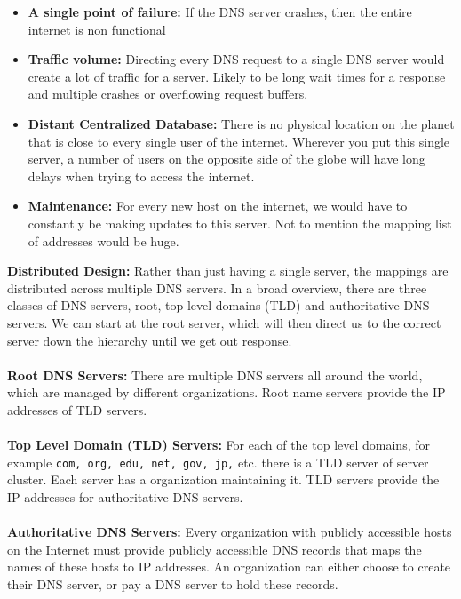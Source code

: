\documentclass[]{article}
\begin{document}
\begin{itemize} 
	\item \textbf{A single point of failure:} If the DNS server crashes, then the entire internet is non functional 
	\item \textbf{Traffic volume:} Directing every DNS request to a single DNS server would create a lot of traffic for a server. Likely to be long wait times for a response and multiple crashes or overflowing request buffers. 
	\item \textbf{Distant Centralized Database:} There is no physical location on the planet that is close to every single user of the internet. Wherever you put this single server, a number of users on the opposite side of the globe will have long delays when trying to access the internet. 
	\item \textbf{Maintenance:} For every new host on the internet, we would have to constantly be making updates to this server. Not to mention the mapping list of addresses would be huge. 
\end{itemize}
\textcolor{Emerald}{\textbf{Distributed Design:}} Rather than 
just having a single server, the mappings are distributed across multiple DNS servers. In a broad overview, there are three classes of DNS servers, root, top-level domains (TLD) and authoritative  DNS servers. We can start at the root server, which will then direct us to the correct server down the hierarchy until we get out response. \\\\
\textcolor{Emerald}{\textbf{Root DNS Servers:}} There are multiple DNS servers all around the world, which are managed by different organizations. Root name servers provide the IP addresses of TLD servers. \\\\
\textcolor{Emerald}{\textbf{Top Level Domain (TLD) Servers:}} For each of the top level domains, for example \texttt{com, org, edu, net, gov, jp,} etc. there is a TLD server of server cluster. Each server has a organization maintaining it. TLD servers provide the IP addresses for authoritative DNS servers. \\\\
\textcolor{Emerald}{\textbf{Authoritative DNS Servers:}} Every organization with publicly accessible hosts on the Internet must provide publicly accessible DNS records that maps the names of these hosts to IP addresses. An organization can either choose to create their DNS server, or pay a DNS server to hold these records. \\\\
\end{document}
